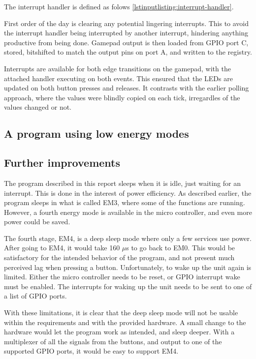 
\label{lstinputlisting:interrupt-handlers}

The interrupt handler is defined as folows \ref{lstinputlisting:interrupt-handler}.

First order of the day is clearing any potential lingering interrupts. This to avoid the interrupt handler being interrupted by another interrupt, hindering anything productive from being done.
Gamepad output is then loaded from GPIO port C, stored, bitshifted to match the output pins on port A, and written to the registry.

Interrupts are available for both edge transitions on the gamepad, with the attached handler executing on both events.
This ensured that the LEDs are updated on both button presses and releases. It contrasts with the earlier polling approach, where the values were blindly copied on each tick, irregardles of the values changed or not.



\label{lstinputlisting:interrupt-handler}

\subsection{A program using low energy modes}

\subsection{Further improvements}
The program described in this report sleeps when it is idle, just waiting for an interrupt.
This is done in the interest of power efficiency.
As described earlier, the program sleeps in what is called EM3, where some of the functions are running.
However, a fourth energy mode is available in the micro controller, and even more power could be saved.

The fourth stage, EM4, is a deep sleep mode where only a few services use power.
After going to EM4, it would take 160 $\mu$s to go back to EM0.
This would be satisfactory for the intended behavior of the program, and not present much perceived lag when pressing a button.
Unfortunately, to wake up the unit again is limited.
Either the micro controller needs to be reset, or GPIO interrupt wake must be enabled.
The interrupts for waking up the unit needs to be sent to one of a list of GPIO ports.\cite{referencemanual}

With these limitations, it is clear that the deep sleep mode will not be usable within the requirements and with the provided hardware.
A small change to the hardware would let the program work as intended, and sleep deeper.
With a multiplexer of all the signals from the buttons, and output to one of the supported GPIO ports, it would be easy to support EM4.
